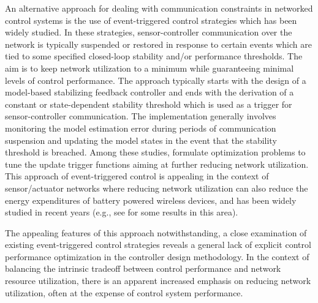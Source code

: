 \documentclass[letterpaper, 10 pt, conference]{ieeeconf}\IEEEoverridecommandlockouts%
\begin{document}
An alternative approach for dealing with communication constraints in networked control systems is the use of event-triggered control strategies which has been widely studied. In these strategies, sensor-controller communication over the network is typically suspended or restored in response to certain events which are tied to some specified closed-loop stability and/or performance thresholds. The aim is to keep network utilization to a minimum while guaranteeing minimal levels of control performance. The approach typically starts with the design of a model-based stabilizing feedback controller and ends with the derivation of a constant or state-dependent stability threshold which is used as a trigger for sensor-controller communication. The implementation generally involves monitoring the model estimation error during periods of communication suspension and updating the model states in the event that the stability threshold is breached. Among these studies, \cite{moreira2016event,groff2016observer} formulate optimization problems to tune the update trigger functions aiming at further reducing network utilization. This approach of event-triggered control is appealing in the context of sensor/actuator networks where reducing network utilization can also reduce the energy expenditures of battery powered wireless devices, and has been widely studied in recent years (e.g., see \cite{mazo2011decentralized,wang2011event,garcia2013model,xue2016actuator} for some results in this area). 

The appealing features of this approach notwithstanding, a close examination of existing event-triggered control strategies reveals a general lack of explicit control performance optimization in the controller design methodology. In the context of balancing the intrinsic tradeoff between control performance and network resource utilization, there is an apparent increased emphasis on reducing network utilization, often at the expense of control system performance. %
\end{document}
